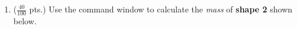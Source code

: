 \documentclass[11pt]{article}
\begin{document}
\begin{description}
\begin{enumerate}
\underline{\hspace{140mm}}\\\\
\underline{\hspace{140mm}}\\\\
\underline{\hspace{140mm}}\\\\

{\textbf volume: \underline{\hspace{60mm}}}\\

\underline{\hspace{140mm}}\\\\
\underline{\hspace{140mm}}\\\\
\underline{\hspace{140mm}}\\\\		
	
{\textbf mass: \underline{\hspace{60mm}}}\\
	
            \item ($\frac{40}{100}$ pts.)
             Use the command window to calculate the {\it mass} of {\bf shape 2} shown below. \\
            

\end{enumerate}
\end{description}
\end{document}
